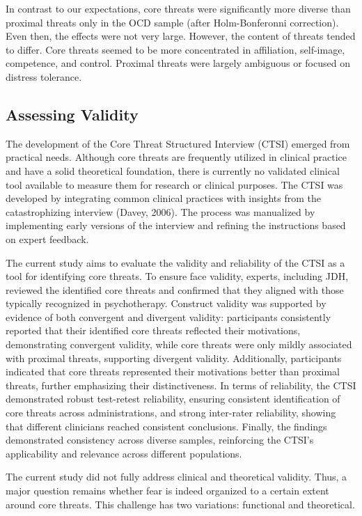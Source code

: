 \documentclass[
  man,floatsintext]{apa7}
\begin{document}
In contrast to our expectations, core threats were significantly more diverse than proximal threats only in the OCD sample (after Holm-Bonferonni correction).
Even then, the effects were not very large.
However, the content of threats tended to differ.
Core threats seemed to be more concentrated in affiliation, self-image, competence, and control.
Proximal threats were largely ambiguous or focused on distress tolerance.

\subsection{Assessing Validity}\label{assessing-validity}

The development of the Core Threat Structured Interview (CTSI) emerged from practical needs.
Although core threats are frequently utilized in clinical practice and have a solid theoretical foundation, there is currently no validated clinical tool available to measure them for research or clinical purposes.
The CTSI was developed by integrating common clinical practices with insights from the catastrophizing interview (Davey, 2006).
The process was manualized by implementing early versions of the interview and refining the instructions based on expert feedback.

The current study aims to evaluate the validity and reliability of the CTSI as a tool for identifying core threats.
To ensure face validity, experts, including JDH, reviewed the identified core threats and confirmed that they aligned with those typically recognized in psychotherapy.
Construct validity was supported by evidence of both convergent and divergent validity:
participants consistently reported that their identified core threats reflected their motivations, demonstrating convergent validity,
while core threats were only mildly associated with proximal threats, supporting divergent validity.
Additionally, participants indicated that core threats represented their motivations better than proximal threats, further emphasizing their distinctiveness.
In terms of reliability, the CTSI demonstrated robust test-retest reliability, ensuring consistent identification of core threats across administrations, and strong inter-rater reliability, showing that different clinicians reached consistent conclusions.
Finally, the findings demonstrated consistency across diverse samples, reinforcing the CTSI's applicability and relevance across different populations.

The current study did not fully address clinical and theoretical validity.
Thus, a major question remains whether fear is indeed organized to a certain extent around core threats.
This challenge has two variations: functional and theoretical.
\end{document}

